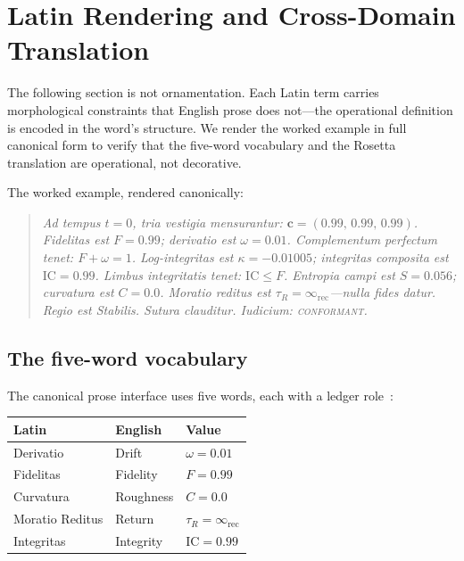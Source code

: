 \documentclass[
  aps,
  prd,
  twocolumn,
  superscriptaddress,
  nofootinbib,
  floatfix
]{revtex4-2}
\newcommand{\tR}{\tau_{\!R}}
\newcommand{\IR}{\infty_{\mathrm{rec}}}
\newcommand{\regime}[1]{\textrm{\upshape\scshape#1}}
\newcommand{\conform}{\regime{conformant}}
\newcommand{\tvec}{\mathbf{c}}
\newcommand{\IC}{\mathrm{IC}}
\begin{document}
\section{Latin Rendering and Cross-Domain
Translation}\label{sec:latin}

The following section is not ornamentation.  Each Latin term
carries morphological constraints that English prose does not---the
operational definition is encoded in the word's structure.  We
render the worked example in full canonical form to verify that the
five-word vocabulary and the Rosetta translation are operational,
not decorative.

The worked example, rendered canonically:

\begin{quote}
\emph{Ad tempus $t = 0$, tria vestigia mensurantur:
$\tvec = (0.99,\, 0.99,\, 0.99)$.  Fidelitas est $F = 0.99$;
derivatio est $\omega = 0.01$.  Complementum perfectum tenet:
$F + \omega = 1$.  Log-integritas est $\kappa = -0.01005$;
integritas composita est $\IC = 0.99$.  Limbus integritatis tenet:
$\IC \leq F$.  Entropia campi est $S = 0.056$; curvatura est
$C = 0.0$.  Moratio reditus est $\tR = \IR$---nulla fides datur.
Regio est Stabilis.  Sutura clauditur.  Iudicium: \conform{}.}
\end{quote}

\subsection{The five-word vocabulary}

The canonical prose interface uses five words, each with a ledger
role~\cite{paulus2025umcp}:

\begin{center}
\begin{tabular}{lll}
\toprule
Latin & English & Value \\
\midrule
Derivatio & Drift & $\omega = 0.01$ \\
Fidelitas & Fidelity & $F = 0.99$ \\
Curvatura & Roughness & $C = 0.0$ \\
Moratio Reditus & Return & $\tR = \IR$ \\
Integritas & Integrity & $\IC = 0.99$ \\
\bottomrule
\end{tabular}
\end{center}
\end{document}
